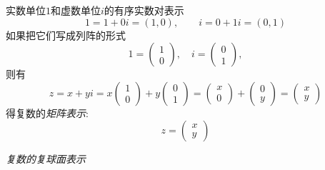 实数单位$1$和虚数单位$i$的有序实数对表示
\begin{equation}\label{}
    1 = 1+0i = (1,0), \qquad  i= 0+1i = (0,1)   
\end{equation}
如果把它们写成列阵的形式
\begin{equation}
    1 = \begin{pmatrix}
        1 \\
        0
    \end{pmatrix},\quad  
    i = \begin{pmatrix}
        0 \\
        1
    \end{pmatrix},
\end{equation}
则有
$$
    z=x+yi = x \begin{pmatrix}
        1 \\
        0
    \end{pmatrix} + y \begin{pmatrix}
        0 \\
        1
    \end{pmatrix} = \begin{pmatrix}
        x \\
        0
    \end{pmatrix} + \begin{pmatrix}
        0 \\
        y
    \end{pmatrix} = \begin{pmatrix}
        x \\
        y
    \end{pmatrix} $$
得复数的\emph{矩阵表示}:
\begin{equation}
    z= \begin{pmatrix}
        x \\
        y
    \end{pmatrix} 
\end{equation}

\noindent \emph{复数的复球面表示} 

